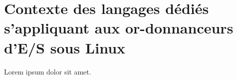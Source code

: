 \section[Contexte des langages dédiés s'appliquant aux ordonnanceurs d'E/S sous Linux]{Contexte des langages dédiés s'appliquant aux or-donnanceurs d'E/S sous Linux}
\label{context}

Lorem ipsum dolor sit amet.
